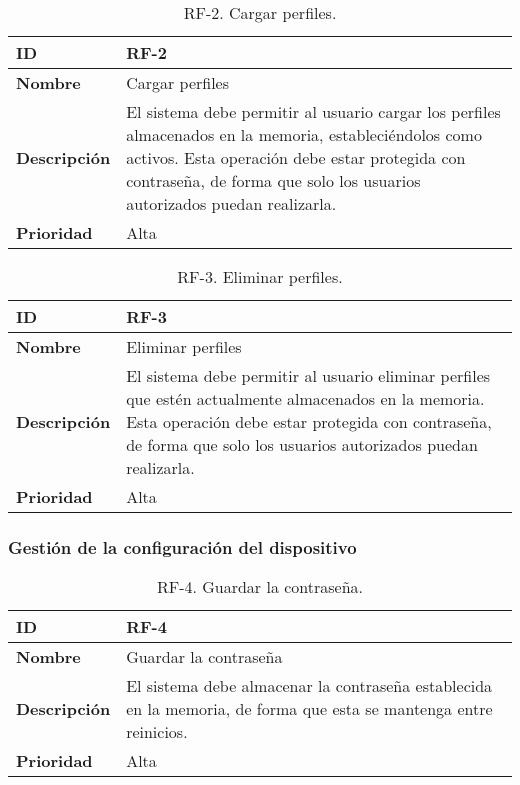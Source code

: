 \begin{table}[h!]
    \centering
    \begin{tabular}{|m{2.5cm}|m{9.27cm}|}
        \hline
        \textbf{ID} & RF-2 \\
        \hline
        \textbf{Nombre} & Cargar perfiles \\
        \hline
        \textbf{Descripción} & El sistema debe permitir al usuario cargar los perfiles almacenados en la memoria, estableciéndolos como activos. Esta operación debe estar protegida con contraseña, de forma que solo los usuarios autorizados puedan realizarla. \\
        \hline
        \textbf{Prioridad} & Alta \\
        \hline
    \end{tabular}
    \caption{RF-2. Cargar perfiles.}
\end{table}

\begin{table}[h!]
    \centering
    \begin{tabular}{|m{2.5cm}|m{9.27cm}|}
        \hline
        \textbf{ID} & RF-3 \\
        \hline
        \textbf{Nombre} & Eliminar perfiles \\
        \hline
        \textbf{Descripción} & El sistema debe permitir al usuario eliminar perfiles que estén actualmente almacenados en la memoria. Esta operación debe estar protegida con contraseña, de forma que solo los usuarios autorizados puedan realizarla. \\
        \hline
        \textbf{Prioridad} & Alta \\
        \hline
    \end{tabular}
    \caption{RF-3. Eliminar perfiles.}
\end{table}

\clearpage

\subsubsection{Gestión de la configuración del dispositivo}

\begin{table}[h!]
    \centering
    \begin{tabular}{|m{2.5cm}|m{9.27cm}|}
        \hline
        \textbf{ID} & RF-4 \\
        \hline
        \textbf{Nombre} & Guardar la contraseña \\
        \hline
        \textbf{Descripción} & El sistema debe almacenar la contraseña establecida en la memoria, de forma que esta se mantenga entre reinicios. \\
        \hline
        \textbf{Prioridad} & Alta \\
        \hline
    \end{tabular}
    \caption{RF-4. Guardar la contraseña.}
\end{table}

